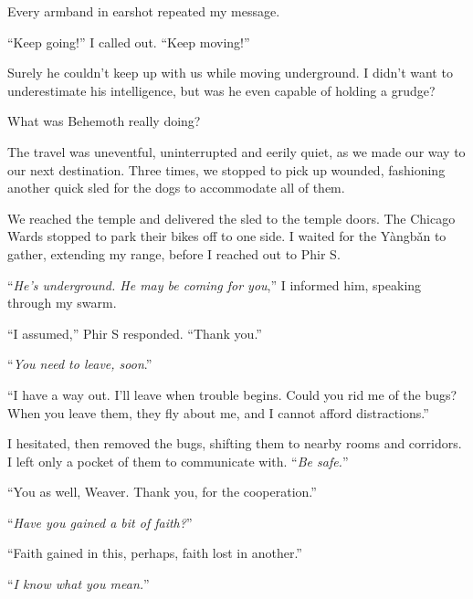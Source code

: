 Every armband in earshot repeated my message.



``Keep going!'' I called out.  ``Keep moving!''



Surely he couldn't keep up with us while moving underground.  I didn't want to underestimate his intelligence, but was he even capable of holding a grudge?



What was Behemoth really doing?



The travel was uneventful, uninterrupted and eerily quiet, as we made our way to our next destination.  Three times, we stopped to pick up wounded, fashioning another quick sled for the dogs to accommodate all of them.



We reached the temple and delivered the sled to the temple doors.  The Chicago Wards stopped to park their bikes off to one side.  I waited for the Y\`{a}ngb\v{a}n to gather, extending my range, before I reached out to Phir S.



``\emph{He's underground.  He may be coming for you},''  I informed him, speaking through my swarm.



``I assumed,'' Phir S responded.  ``Thank you.''



``\emph{You need to leave, soon}.''



``I have a way out.  I'll leave when trouble begins.  Could you rid me of the bugs?  When you leave them, they fly about me, and I cannot afford distractions.''



I hesitated, then removed the bugs, shifting them to nearby rooms and corridors.  I left only a pocket of them to communicate with.  ``\emph{Be safe.}''



``You as well, Weaver.  Thank you, for the cooperation.''



``\emph{Have you gained a bit of faith?}''



``Faith gained in this, perhaps, faith lost in another.''



``\emph{I know what you mean.}''



